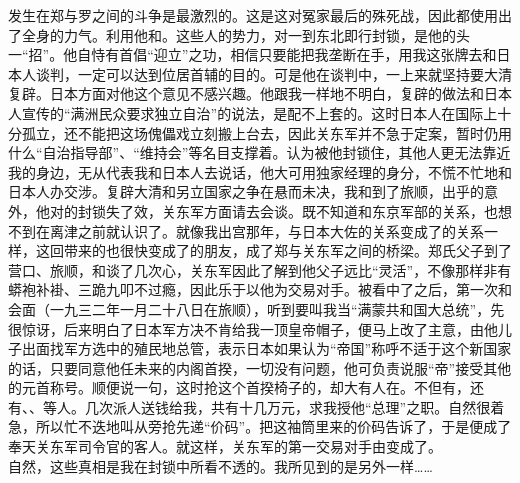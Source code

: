 发生在郑与罗之间的斗争是最激烈的。这是这对冤家最后的殊死战，因此都使用出了全身的力气。利用他和。这些人的势力，对一到东北即行封锁，是他的头一“招”。他自恃有首倡“迎立”之功，相信只要能把我垄断在手，用我这张牌去和日本人谈判，一定可以达到位居首辅的目的。可是他在谈判中，一上来就坚持要大清复辟。日本方面对他这个意见不感兴趣。他跟我一样地不明白，复辟的做法和日本人宣传的“满洲民众要求独立自治”的说法，是配不上套的。这时日本人在国际上十分孤立，还不能把这场傀儡戏立刻搬上台去，因此关东军并不急于定案，暂时仍用什么“自治指导部”、“维持会”等名目支撑着。认为被他封锁住，其他人更无法靠近我的身边，无从代表我和日本人去说话，他大可用独家经理的身分，不慌不忙地和日本人办交涉。复辟大清和另立国家之争在悬而未决，我和到了旅顺，出乎的意外，他对的封锁失了效，关东军方面请去会谈。既不知道和东京军部的关系，也想不到在离津之前就认识了。就像我出宫那年，与日本大佐的关系变成了的关系一样，这回带来的也很快变成了的朋友，成了郑与关东军之间的桥梁。郑氏父子到了营口、旅顺，和谈了几次心，关东军因此了解到他父子远比“灵活”，不像那样非有蟒袍补褂、三跪九叩不过瘾，因此乐于以他为交易对手。被看中了之后，第一次和会面（一九三二年一月二十八日在旅顺），听到要叫我当“满蒙共和国大总统”，先很惊讶，后来明白了日本军方决不肯给我一顶皇帝帽子，便马上改了主意，由他儿子出面找军方选中的殖民地总管，表示日本如果认为“帝国”称呼不适于这个新国家的话，只要同意他任未来的内阁首揆，一切没有问题，他可负责说服“帝”接受其他的元首称号。顺便说一句，这时抢这个首揆椅子的，却大有人在。不但有，还有、、等人。几次派人送钱给我，共有十几万元，求我授他“总理”之职。自然很着急，所以忙不迭地叫从旁抢先递“价码”。把这袖筒里来的价码告诉了，于是便成了奉天关东军司令官的客人。就这样，关东军的第一交易对手由变成了。\\

自然，这些真相是我在封锁中所看不透的。我所见到的是另外一样……
